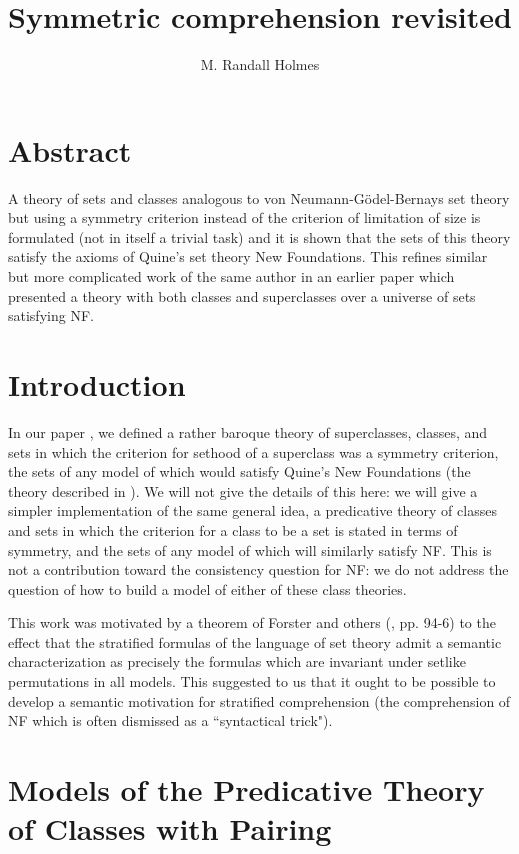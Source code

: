 \documentclass[12pt]{article}
\title{Symmetric comprehension revisited}
\author{M. Randall Holmes}
\date{}
\begin{document}
\maketitle

\section{Abstract}  A theory of sets and classes analogous to von Neumann-G\"odel-Bernays set theory but using a symmetry criterion instead of the criterion of limitation of size is formulated (not in itself a trivial task) and it is shown that the sets of this theory satisfy the axioms of Quine's set theory New Foundations.  This refines similar but more complicated work of the same author in an earlier paper which presented a theory with both classes and superclasses over a universe of sets satisfying NF.

\tableofcontents

\section{Introduction}

In our paper \cite{symmetry}, we defined a rather baroque theory of superclasses, classes, and sets in which the criterion for sethood of a superclass was a symmetry criterion, the sets of any model of which would satisfy Quine's New Foundations (the theory described in \cite{nf}).   We will not give the details of this here:  we will give a simpler implementation of the same general idea, a predicative theory of classes and sets in which the criterion for a class to be a set is stated in terms of symmetry, and the sets of any model of which will similarly satisfy NF.   This is not a contribution toward the consistency question for NF:  we do not address the question of  how to build a model of either of these class theories.

This work was motivated by a theorem of Forster and others (\cite{forsterbook}, pp. 94-6) to the effect  that the stratified formulas of the language of set theory admit a semantic characterization as precisely the formulas which are invariant under setlike permutations in all models.  This suggested  to us that it ought to be possible to develop a semantic motivation for stratified comprehension (the comprehension of NF which is often dismissed as a ``syntactical trick").

\newpage

\section{Models of the Predicative Theory of Classes with Pairing}
\end{document}
